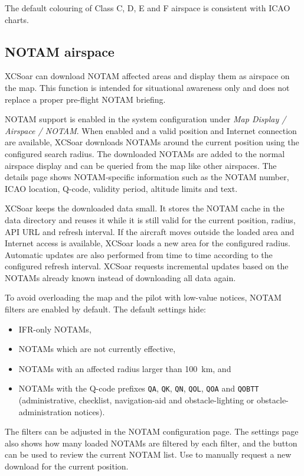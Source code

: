 The default colouring of Class C, D, E and F airspace is consistent
with ICAO charts.


\subsection*{NOTAM airspace}\label{sec:notam-airspace}

XCSoar can download NOTAM affected areas and display them as airspace
on the map.  This function is intended for situational awareness only
and does not replace a proper pre-flight NOTAM briefing.

NOTAM support is enabled in the system configuration under
\emph{Map Display / Airspace / NOTAM}.  When enabled and a valid
position and Internet connection are available, XCSoar downloads NOTAMs
around the current position using the configured search radius.  The
downloaded NOTAMs are added to the normal airspace display and can be
queried from the map like other airspaces.  The details page shows
NOTAM-specific information such as the NOTAM number, ICAO location,
Q-code, validity period, altitude limits and text.

XCSoar keeps the downloaded data small.  It stores the NOTAM cache in
the data directory and reuses it while it is still valid for the current
position, radius, API URL and refresh interval.  If the aircraft moves
outside the loaded area and Internet access is available, XCSoar loads a
new area for the configured radius.  Automatic updates are also performed
from time to time according to the configured refresh interval.  XCSoar
requests incremental updates based on the NOTAMs already known instead of
downloading all data again.

To avoid overloading the map and the pilot with low-value notices,
NOTAM filters are enabled by default.  The default settings hide:
\begin{itemize}
\item IFR-only NOTAMs,
\item NOTAMs which are not currently effective,
\item NOTAMs with an affected radius larger than 100~km, and
\item NOTAMs with the Q-code prefixes \texttt{QA}, \texttt{QK},
  \texttt{QN}, \texttt{QOL}, \texttt{QOA} and \texttt{QOBTT}
  (administrative, checklist, navigation-aid and obstacle-lighting or
  obstacle-administration notices).
\end{itemize}

The filters can be adjusted in the NOTAM configuration page.  The
settings page also shows how many loaded NOTAMs are filtered by each
filter, and the  button can be used to review the current
NOTAM list.  Use  to manually request a new download for
the current position.


